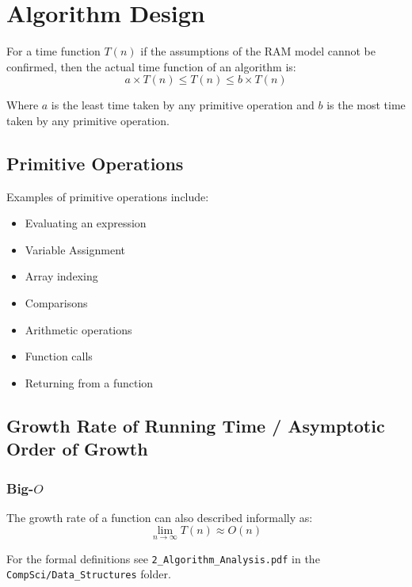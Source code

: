 \documentclass[12pt letter]{report}
\begin{document}
\chapter{Algorithm Design}

For a time function $T \left( n \right) $ if the assumptions of the RAM model cannot be confirmed, then the actual time
function of an algorithm is:
\[
  a \times  T \left( n \right)  \leq T \left( n \right)  \leq b \times T \left( n \right)
\]

\noindent Where $a$ is the least time taken by any primitive operation and $b$ is the most time taken by any primitive operation.

\section{Primitive Operations}


\noindent Examples of primitive operations include:
\begin{itemize}
  \item Evaluating an expression
  \item Variable Assignment
  \item Array indexing
  \item Comparisons
  \item Arithmetic operations
  \item Function calls
  \item Returning from a function
\end{itemize}

\section{Growth Rate of Running Time  / Asymptotic Order of Growth}

\subsection{ Big-$O$}
The growth rate of a function can also described informally as:
\[
  \lim_{n \to \infty} T \left( n \right) \approx O \left( n \right)
\]

\noindent For the formal definitions see \lstinline{2_Algorithm_Analysis.pdf} in the \lstinline{CompSci/Data_Structures} folder.
\end{document}
